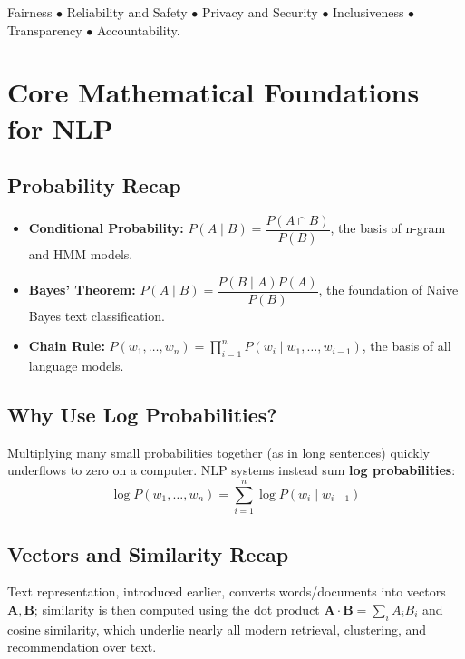 \documentclass[11pt,a4paper]{article}
\begin{document}
\begin{conceptbox}
Fairness $\bullet$ Reliability and Safety $\bullet$ Privacy and Security $\bullet$ Inclusiveness $\bullet$ Transparency $\bullet$ Accountability.
\end{conceptbox}

\section{Core Mathematical Foundations for NLP}

\subsection{Probability Recap}
\begin{itemize}[leftmargin=*]
  \item \textbf{Conditional Probability:} $P(A\mid B)=\dfrac{P(A\cap B)}{P(B)}$, the basis of n-gram and HMM models.
  \item \textbf{Bayes' Theorem:} $P(A\mid B)=\dfrac{P(B\mid A)P(A)}{P(B)}$, the foundation of Naive Bayes text classification.
  \item \textbf{Chain Rule:} $P(w_1,\ldots,w_n)=\prod_{i=1}^n P(w_i\mid w_1,\ldots,w_{i-1})$, the basis of all language models.
\end{itemize}

\subsection{Why Use Log Probabilities?}
\begin{conceptbox}
Multiplying many small probabilities together (as in long sentences) quickly underflows to zero on a computer. NLP systems instead sum \textbf{log probabilities}:
$$
\log P(w_1,\ldots,w_n) = \sum_{i=1}^{n}\log P(w_i \mid w_{i-1})
$$
\end{conceptbox}

\subsection{Vectors and Similarity Recap}
Text representation, introduced earlier, converts words/documents into vectors $\mathbf{A}, \mathbf{B}$; similarity is then computed using the dot product $\mathbf{A}\cdot\mathbf{B}=\sum_i A_iB_i$ and cosine similarity, which underlie nearly all modern retrieval, clustering, and recommendation over text.
\end{document}
